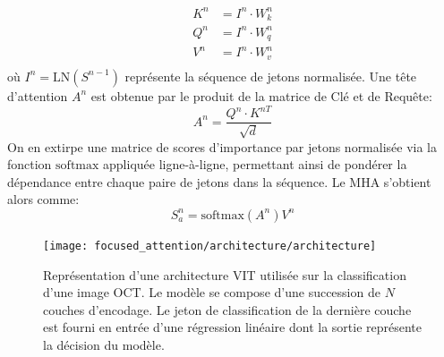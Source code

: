\begin{align}
	K^n &= I^n \cdot W^n_k \\
	Q^n &= I^n \cdot W^n_q \\
	V^n &= I^n \cdot W^n_v \\
\end{align}
où $I^n = \text{LN}(S^{n-1})$ représente la séquence de jetons normalisée. Une tête d'attention $A^n$ est obtenue par le produit de la matrice de Clé et de Requête:
\begin{equation}
	A^n = \frac{Q^n \cdot K^{nT}}{\sqrt{d}}
\end{equation}
On en extirpe une matrice de scores d'importance par jetons normalisée via la fonction $\text{softmax}$ appliquée ligne-à-ligne, permettant ainsi de pondérer la dépendance entre chaque paire de jetons dans la séquence.
Le \ac{MHA} s'obtient alors comme:
\begin{equation}
	S^{n}_{a} = \text{softmax}(A^n)V^n
\end{equation}
\begin{figure}[tbh!]
	\centering
	\texttt{[image: focused\_attention/architecture/architecture]}
	\caption{Représentation d'une architecture \ac{VIT} utilisée sur la classification d'une image OCT. Le modèle se compose d'une succession de $N$ couches d'encodage. Le jeton de classification de la dernière couche est fourni en entrée d'une régression linéaire dont la sortie représente la décision du modèle.}
	\label{fig:ViTEncoderBlock}
\end{figure}

